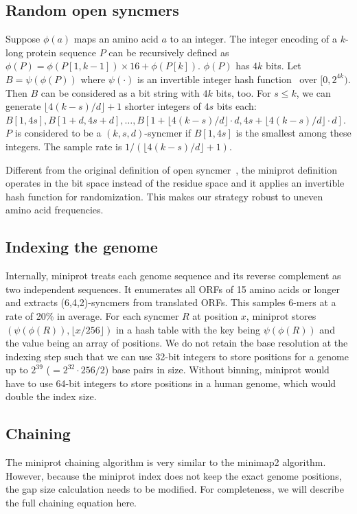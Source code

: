 \documentclass{bioinfo}
\begin{document}
\begin{methods}
\subsection{Random open syncmers}

Suppose $\phi(a)$ maps an amino acid $a$ to an integer. The integer encoding
of a $k$-long protein sequence $P$ can be recursively defined as 
$\phi(P)=\phi(P[1,k-1])\times16+\phi(P[k])$. $\phi(P)$ has $4k$ bits. Let
$B=\psi(\phi(P))$ where $\psi(\cdot)$ is an invertible integer hash
function~\citep{Li:2016aa} over $[0,2^{4k})$. Then $B$ can be considered as a
bit string with $4k$ bits, too. For $s\le k$, we can generate
$\lfloor4(k-s)/d\rfloor+1$ shorter integers of $4s$ bits each: $B[1,4s],
B[1+d,4s+d], \ldots,
B[1+\lfloor4(k-s)/d\rfloor\cdot d,4s+\lfloor4(k-s)/d\rfloor\cdot d]$. $P$ is considered
to be a $(k,s,d)$-syncmer if $B[1,4s]$ is the smallest among these integers.
The sample rate is $1/(\lfloor4(k-s)/d\rfloor+1)$.

Different from the original definition of open syncmer~\citep{Edgar:2021vk},
the miniprot definition operates in the bit space instead of the residue space
and it applies an invertible hash function for randomization. This makes our
strategy robust to uneven amino acid frequencies.

\subsection{Indexing the genome}

Internally, miniprot treats each genome sequence and its reverse complement as
two independent sequences. It enumerates all ORFs of 15 amino acids or longer
and extracts (6,4,2)-syncmers from translated ORFs. This samples 6-mers at a
rate of 20\% in average. For each syncmer $R$ at position $x$, miniprot stores
$(\psi(\phi(R)), \lfloor x/256\rfloor)$ in a hash table with the key being
$\psi(\phi(R))$ and the value being an array of positions. We do not retain the
base resolution at the indexing step such that we can use 32-bit integers to
store positions for a genome up to $2^{39}$ ($=2^{32}\cdot 256/2$) base pairs
in size. Without binning, miniprot would have to use 64-bit integers to store
positions in a human genome, which would double the index size.

\subsection{Chaining}

The miniprot chaining algorithm is very similar to the minimap2 algorithm.
However, because the miniprot index does not keep the exact genome positions,
the gap size calculation needs to be modified. For completeness, we will
describe the full chaining equation here.


\end{methods}
\end{document}
